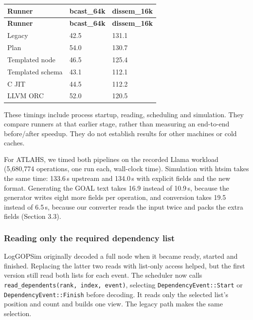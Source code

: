\documentclass[10pt,a4paper]{article}
\begin{document}
{\small
\begin{longtable}{P{0.24\dimexpr{}\tabcolsep\relax}P{0.38\dimexpr{}\tabcolsep\relax}P{0.38\dimexpr{}\tabcolsep\relax}}
\toprule
\textbf{Runner} & \textbf{bcast\_64k} & \textbf{dissem\_16k} \\
\midrule
\endfirsthead
\toprule
\textbf{Runner} & \textbf{bcast\_64k} & \textbf{dissem\_16k} \\
\midrule
\endhead
\bottomrule
\endfoot
Legacy & 42.5 & 131.1 \\
Plan & 54.0 & 130.7 \\
Templated node & 46.5 & 125.4 \\
Templated schema & 43.1 & 112.1 \\
C JIT & 44.5 & 112.2 \\
LLVM ORC & 52.0 & 120.5 \\
\end{longtable}
}

These timings include process startup, reading, scheduling and simulation. They compare runners at that earlier stage, rather than measuring an end-to-end before/after speedup. They do not establish results for other machines or cold caches.

For ATLAHS, we timed both pipelines on the recorded Llama workload (5,680,774 operations, one run each, wall-clock time). Simulation with htsim takes the same time: 133.6\,s upstream and 134.0\,s with explicit fields and the new format. Generating the GOAL text takes 16.9 instead of 10.9\,s, because the generator writes eight more fields per operation, and conversion takes 19.5 instead of 6.5\,s, because our converter reads the input twice and packs the extra fields (Section 3.3).

\hypertarget{reading-dependency-lists-only}{}
\subsubsection{Reading only the required dependency list}

LogGOPSim originally decoded a full node when it became ready, started and finished. Replacing the latter two reads with list-only access helped, but the first version still read both lists for each event. The scheduler now calls \texttt{read\_\allowbreak{}dependents(rank, index, event)}, selecting \texttt{DependencyEvent::Start} or \texttt{DependencyEvent::Finish} before decoding. It reads only the selected list's position and count and builds one view. The legacy path makes the same selection.
\end{document}
